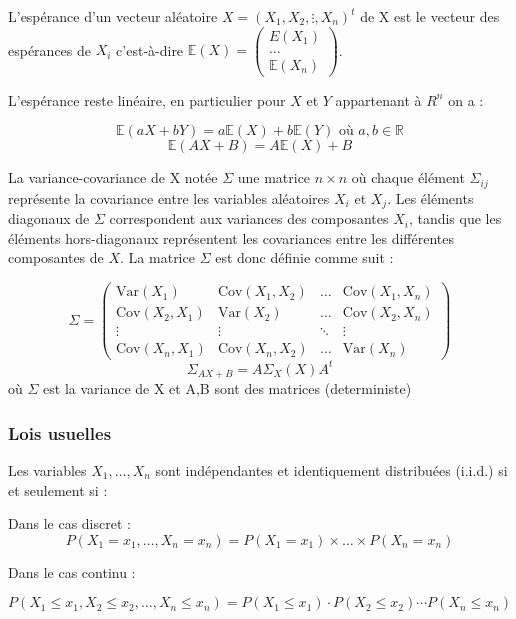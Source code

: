 \documentclass[
  letterpaper,
  DIV=11,
  numbers=noendperiod]{scrartcl}
\begin{document}
L'espérance d'un vecteur aléatoire \(X = (X_1, X_2, \vdots, X_n)^t\) de
X est le vecteur des espérances de \(X_i\) c'est-à-dire
\(\mathbb{E}(X) = \left(\begin{array}{c} E(X_1) \\ \ldots \\ \mathbb{E}(X_n) \end{array} \right)\).

L'espérance reste linéaire, en particulier pour \(X\) et \(Y\)
appartenant à \(R^n\) on a :

\[\mathbb{E}(aX + bY) = a\mathbb{E}(X) + b\mathbb{E}(Y) \text{ où } a,b \in \mathbb{R}\]
\[\mathbb{E}(AX + B) = A\mathbb{E}(X)+B\]

La variance-covariance de X notée \(\Sigma\) une matrice \(n \times n\)
où chaque élément \(\Sigma_{ij}\) représente la covariance entre les
variables aléatoires \(X_i\) et \(X_j\). Les éléments diagonaux de
\(\Sigma\) correspondent aux variances des composantes \(X_i\), tandis
que les éléments hors-diagonaux représentent les covariances entre les
différentes composantes de \(X\). La matrice \(\Sigma\) est donc définie
comme suit :

\[
\Sigma = \begin{pmatrix}
\text{Var}(X_1) & \text{Cov}(X_1, X_2) & \dots & \text{Cov}(X_1, X_n) \\
\text{Cov}(X_2, X_1) & \text{Var}(X_2) & \dots & \text{Cov}(X_2, X_n) \\
\vdots & \vdots & \ddots & \vdots \\
\text{Cov}(X_n, X_1) & \text{Cov}(X_n, X_2) & \dots & \text{Var}(X_n)
\end{pmatrix}
\] \[ \Sigma_{AX + B} = A\Sigma_X(X)A^t\] où \(\Sigma\) est la variance
de X et A,B sont des matrices (deterministe)

\subsubsection{Lois usuelles}\label{lois-usuelles}

\begin{tcolorbox}[enhanced jigsaw, rightrule=.15mm, bottomrule=.15mm, opacitybacktitle=0.6, leftrule=.75mm, colbacktitle=quarto-callout-tip-color!10!white, colback=white, opacityback=0, toprule=.15mm, left=2mm, title=\textcolor{quarto-callout-tip-color}{\faLightbulb}\hspace{0.5em}{Tip}, breakable, bottomtitle=1mm, colframe=quarto-callout-tip-color-frame, toptitle=1mm, titlerule=0mm, coltitle=black, arc=.35mm]

Les variables \(X_1, \ldots, X_n\) sont indépendantes et identiquement
distribuées (i.i.d.) si et seulement si :

Dans le cas discret :
\[P(X_1 = x_1, \ldots, X_n = x_n) = P(X_1 = x_1) \times \ldots \times P(X_n = x_n)\]

Dans le cas continu :

\[P(X_1 \leq x_1, X_2 \leq x_2, \ldots, X_n \leq x_n) = P(X_1 \leq x_1) \cdot P(X_2 \leq x_2) \cdots P(X_n \leq x_n)\]

\end{tcolorbox}
\end{document}
